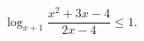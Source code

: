 \begin{ex}[type=inequality]
	\begin{condition}
		 $ \log_{x+ 1}\dfrac{x^2 + 3x - 4}{2x - 4}\leqslant1 .$
	\end{condition}
\end{ex}